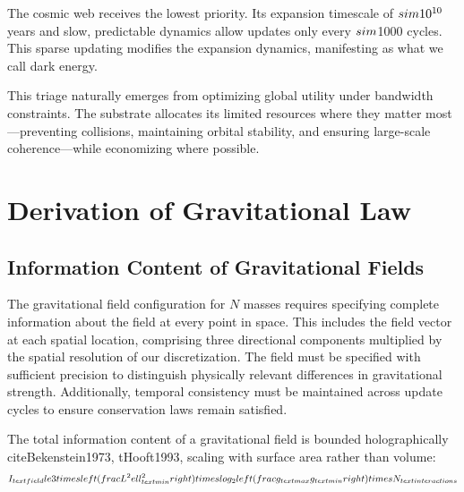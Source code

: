 \documentclass[twocolumn,prd,amsmath,amssymb,aps,superscriptaddress,nofootinbib]{revtex4-2}
\begin{document}
The cosmic web receives the lowest priority. Its expansion timescale of $\\sim 10^{10}$ years and slow, predictable dynamics allow updates only every $\\sim$1000 cycles. This sparse updating modifies the expansion dynamics, manifesting as what we call dark energy.

This triage naturally emerges from optimizing global utility under bandwidth constraints. The substrate allocates its limited resources where they matter most---preventing collisions, maintaining orbital stability, and ensuring large-scale coherence---while economizing where possible.

\section{Derivation of Gravitational Law}
\label{sec:derivation}

\subsection{Information Content of Gravitational Fields}

The gravitational field configuration for $N$ masses requires specifying complete information about the field at every point in space. This includes the field vector at each spatial location, comprising three directional components multiplied by the spatial resolution of our discretization. The field must be specified with sufficient precision to distinguish physically relevant differences in gravitational strength. Additionally, temporal consistency must be maintained across update cycles to ensure conservation laws remain satisfied.

The total information content of a gravitational field is bounded holographically \\cite{Bekenstein1973, tHooft1993}, scaling with surface area rather than volume:
\begin{equation}
I_{\\text{field}} \\le 3 \\times \\left(\\frac{L^2}{\\ell_{\\text{min}}^2}\\right) \\times \\log_2\\left(\\frac{g_{\\text{max}}}{g_{\\text{min}}}\\right) \\times N_{\\text{interactions}}
\end{equation}
\end{document}
